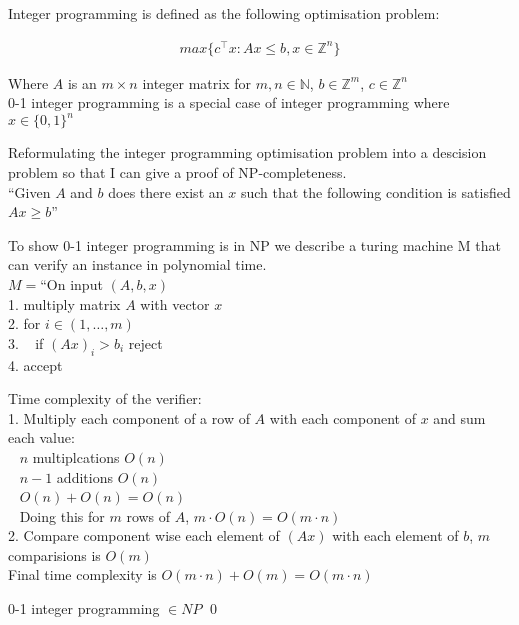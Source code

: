 \documentclass[mathserif,handout]{beamer}
\begin{document}
Integer programming is defined as the following optimisation problem:

\begin{align}
	max \{ c^\top x : Ax \leq b, x \in \mathbb{Z}^n\}
\end{align}

Where $A$ is an $m \times n$ integer matrix for $m,n \in \mathbb{N}$, $b \in
\mathbb{Z}^m$, $c \in \mathbb{Z}^n$\\

0-1 integer programming is a special case of integer programming where $x \in
\{0,1\}^n$

Reformulating the integer programming optimisation problem into a descision
problem so that I can give a proof of NP-completeness.\\

``Given $A$ and $b$ does there exist an $x$ such that the following condition
is satisfied $Ax \geq b$''

To show 0-1 integer programming is in NP we describe a turing machine M that
can verify an instance in polynomial time.\\

$M = $``On input $(A, b, x)$\\
1. multiply matrix $A$ with vector $x$\\
2. for $i \in (1,\ldots,m)$\\
3. ~ if $(Ax)_i > b_i$ reject\\
4. accept


Time complexity of the verifier:\\
1. Multiply each component of a row of $A$ with each component of $x$ and sum
each value:\\
~ $n$ multiplcations $O(n)$\\
~ $n - 1$ additions $O(n)$\\
~ $O(n) + O(n) = O(n)$\\
~ Doing this for $m$ rows of $A$, $m \cdot O(n) = O(m \cdot n )$\\

2. Compare component wise each element of $(Ax)$ with each element of $b$, $m$
comparisions is $O(m)$\\

Final time complexity is $O(m \cdot n) + O(m) = O(m \cdot n)$

0-1 integer programming $\in \mathit{NP}$ \qed
\end{document}
